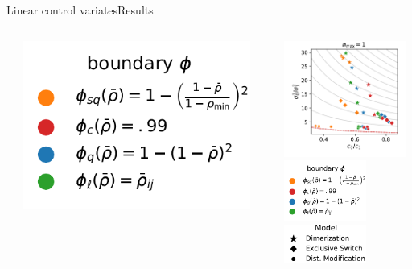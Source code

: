 \documentclass[9pt]{beamer}
\begin{document}
\begin{frame}{Linear control variates}{Results}
\begin{columns}
\begin{column}{.5\paperwidth}
\begin{columns}
\begin{column}{.6\textwidth}
                        \end{column}
                        \begin{column}{.39\textwidth}
                            \includegraphics[width=\textwidth]{../gfx/legend_1.pdf}
                        \end{column}
                \end{columns}
        \end{column}
        \begin{column}{.1\paperwidth}\end{column}
        \begin{column}{.4\paperwidth}
            \includegraphics[width=4cm]{../gfx/eff_landscape_order1.pdf}\\
            \includegraphics[width=27mm]{../gfx/legend_1.pdf}
            \includegraphics[width=27mm]{../gfx/legend_models.pdf}
        \end{column}
    \end{columns}
\end{frame}
\end{document}
